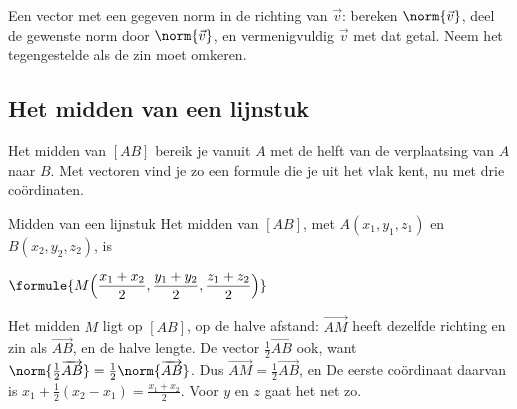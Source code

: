 
\begin{werkwijze}
Een vector met een gegeven norm in de richting van $\vec v$: bereken $\norm{\vec v}$, deel de gewenste norm door $\norm{\vec v}$, en vermenigvuldig $\vec v$ met dat getal. Neem het tegengestelde als de zin moet omkeren.
\end{werkwijze}

\begin{oefeningen}

\end{oefeningen}

\subsection{Het midden van een lijnstuk}

Het midden van $[AB]$ bereik je vanuit $A$ met de helft van de verplaatsing van $A$ naar $B$. Met vectoren vind je zo een formule die je uit het vlak kent, nu met drie coördinaten.

\begin{theorie}
\begin{stelling}{Midden van een lijnstuk}
Het midden van $[AB]$, met $A(x_1, y_1, z_1)$ en $B(x_2, y_2, z_2)$, is

\vspace{1mm}
\qquad $\formule{M\Bigl(\dfrac{x_1 + x_2}{2}, \dfrac{y_1 + y_2}{2}, \dfrac{z_1 + z_2}{2}\Bigr)}$
\end{stelling}
\begin{bewijs}
Het midden $M$ ligt op $[AB]$, op de halve afstand: $\overrightarrow{AM}$ heeft dezelfde richting en zin als $\overrightarrow{AB}$, en de halve lengte. De vector $\frac12\overrightarrow{AB}$ ook, want $\norm{\frac12\overrightarrow{AB}} = \frac12\norm{\overrightarrow{AB}}$. Dus $\overrightarrow{AM} = \frac12\overrightarrow{AB}$, en
De eerste coördinaat daarvan is $x_1 + \frac12(x_2 - x_1) = \frac{x_1 + x_2}{2}$. Voor $y$ en $z$ gaat het net zo.
\end{bewijs}
\end{theorie}

